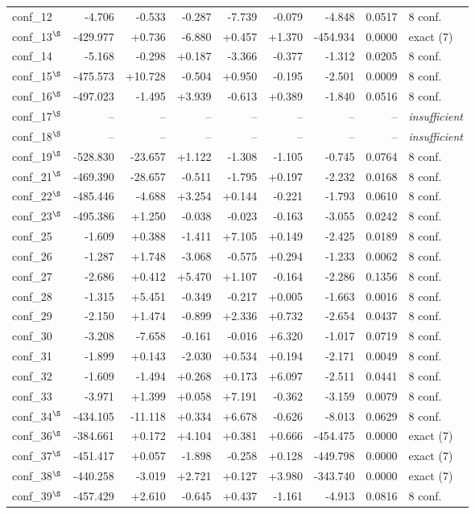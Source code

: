 \begin{longtable}{@{}lrrrrrrrl@{}}
conf\_12 & -4.706 & -0.533 & -0.287 & -7.739 & -0.079 & -4.848 & 0.0517 & 8 conf. \\
conf\_13$^{\S}$ & -429.977 & +0.736 & -6.880 & +0.457 & +1.370 & -454.934 & 0.0000 & exact (7) \\
conf\_14 & -5.168 & -0.298 & +0.187 & -3.366 & -0.377 & -1.312 & 0.0205 & 8 conf. \\
conf\_15$^{\S}$ & -475.573 & +10.728 & -0.504 & +0.950 & -0.195 & -2.501 & 0.0009 & 8 conf. \\
conf\_16$^{\S}$ & -497.023 & -1.495 & +3.939 & -0.613 & +0.389 & -1.840 & 0.0516 & 8 conf. \\
conf\_17$^{\S}$ & -- & -- & -- & -- & -- & -- & -- & \textit{insufficient} \\
conf\_18$^{\S}$ & -- & -- & -- & -- & -- & -- & -- & \textit{insufficient} \\
conf\_19$^{\S}$ & -528.830 & -23.657 & +1.122 & -1.308 & -1.105 & -0.745 & 0.0764 & 8 conf. \\
conf\_21$^{\S}$ & -469.390 & -28.657 & -0.511 & -1.795 & +0.197 & -2.232 & 0.0168 & 8 conf. \\
conf\_22$^{\S}$ & -485.446 & -4.688 & +3.254 & +0.144 & -0.221 & -1.793 & 0.0610 & 8 conf. \\
conf\_23$^{\S}$ & -495.386 & +1.250 & -0.038 & -0.023 & -0.163 & -3.055 & 0.0242 & 8 conf. \\
conf\_25 & -1.609 & +0.388 & -1.411 & +7.105 & +0.149 & -2.425 & 0.0189 & 8 conf. \\
conf\_26 & -1.287 & +1.748 & -3.068 & -0.575 & +0.294 & -1.233 & 0.0062 & 8 conf. \\
conf\_27 & -2.686 & +0.412 & +5.470 & +1.107 & -0.164 & -2.286 & 0.1356 & 8 conf. \\
conf\_28 & -1.315 & +5.451 & -0.349 & -0.217 & +0.005 & -1.663 & 0.0016 & 8 conf. \\
conf\_29 & -2.150 & +1.474 & -0.899 & +2.336 & +0.732 & -2.654 & 0.0437 & 8 conf. \\
conf\_30 & -3.208 & -7.658 & -0.161 & -0.016 & +6.320 & -1.017 & 0.0719 & 8 conf. \\
conf\_31 & -1.899 & +0.143 & -2.030 & +0.534 & +0.194 & -2.171 & 0.0049 & 8 conf. \\
conf\_32 & -1.609 & -1.494 & +0.268 & +0.173 & +6.097 & -2.511 & 0.0441 & 8 conf. \\
conf\_33 & -3.971 & +1.399 & +0.058 & +7.191 & -0.362 & -3.159 & 0.0079 & 8 conf. \\
conf\_34$^{\S}$ & -434.105 & -11.118 & +0.334 & +6.678 & -0.626 & -8.013 & 0.0629 & 8 conf. \\
conf\_36$^{\S}$ & -384.661 & +0.172 & +4.104 & +0.381 & +0.666 & -454.475 & 0.0000 & exact (7) \\
conf\_37$^{\S}$ & -451.417 & +0.057 & -1.898 & -0.258 & +0.128 & -449.798 & 0.0000 & exact (7) \\
conf\_38$^{\S}$ & -440.258 & -3.019 & +2.721 & +0.127 & +3.980 & -343.740 & 0.0000 & exact (7) \\
conf\_39$^{\S}$ & -457.429 & +2.610 & -0.645 & +0.437 & -1.161 & -4.913 & 0.0816 & 8 conf. \\
\end{longtable}
